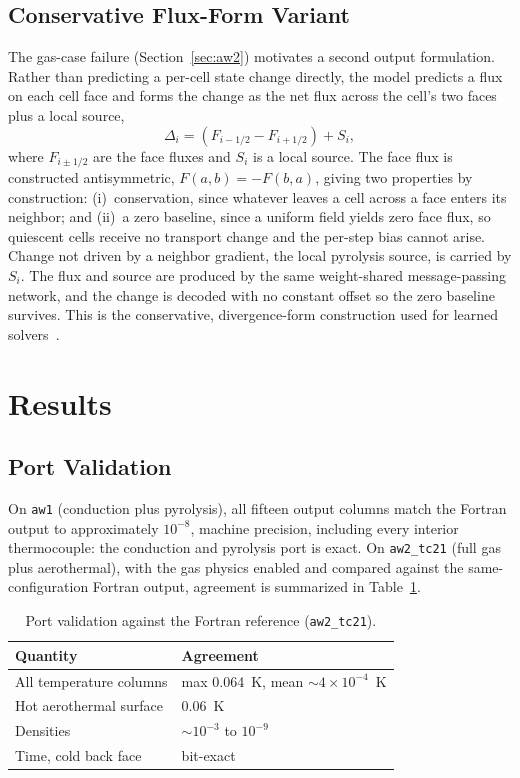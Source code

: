 \documentclass[conference]{IEEEtran}
\begin{document}
\subsection{Conservative Flux-Form Variant}
The gas-case failure (Section~\ref{sec:aw2}) motivates a second output
formulation. Rather than predicting a per-cell state change directly, the model
predicts a flux on each cell face and forms the change as the net flux across the
cell's two faces plus a local source,
\begin{equation}
\Delta_i = \left(F_{i-1/2} - F_{i+1/2}\right) + S_i ,
\end{equation}
where $F_{i\pm1/2}$ are the face fluxes and $S_i$ is a local source. The face flux
is constructed antisymmetric, $F(a,b) = -F(b,a)$, giving two properties by
construction: (i)~conservation, since whatever leaves a cell across a face enters
its neighbor; and (ii)~a zero baseline, since a uniform field yields zero face
flux, so quiescent cells receive no transport change and the per-step bias cannot
arise. Change not driven by a neighbor gradient, the local pyrolysis source, is
carried by $S_i$. The flux and source are produced by the same weight-shared
message-passing network, and the change is decoded with no constant offset so the
zero baseline survives. This is the conservative, divergence-form construction
used for learned solvers~\cite{brandstetter2022,kochkov2021}.

\section{Results}
\subsection{Port Validation}
On \texttt{aw1} (conduction plus pyrolysis), all fifteen output columns match the
Fortran output to approximately $10^{-8}$, machine precision, including every
interior thermocouple: the conduction and pyrolysis port is exact. On
\texttt{aw2\_tc21} (full gas plus aerothermal), with the gas physics enabled and
compared against the same-configuration Fortran output, agreement is summarized in
Table~\ref{tab:val}.
\begin{table}[t]
\caption{Port validation against the Fortran reference (\texttt{aw2\_tc21}).}
\label{tab:val}
\centering
\begin{tabular}{ll}
\toprule
Quantity & Agreement \\
\midrule
All temperature columns & max 0.064~K, mean $\sim$$4\times10^{-4}$~K \\
Hot aerothermal surface & 0.06~K \\
Densities & $\sim$$10^{-3}$ to $10^{-9}$ \\
Time, cold back face & bit-exact \\
\bottomrule
\end{tabular}
\end{table}
\end{document}
